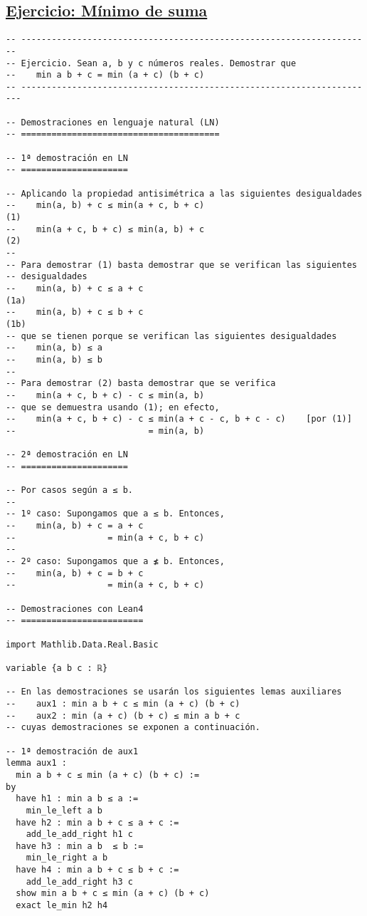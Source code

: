 \subsection{\href{./src/Basicos/Minimo\_de\_suma.lean}{Ejercicio: Mínimo de suma}}
\label{sec:org376a350}
\begin{verbatim}
-- ---------------------------------------------------------------------
-- Ejercicio. Sean a, b y c números reales. Demostrar que
--    min a b + c = min (a + c) (b + c)
-- ----------------------------------------------------------------------

-- Demostraciones en lenguaje natural (LN)
-- =======================================

-- 1ª demostración en LN
-- =====================

-- Aplicando la propiedad antisimétrica a las siguientes desigualdades
--    min(a, b) + c ≤ min(a + c, b + c)                               (1)
--    min(a + c, b + c) ≤ min(a, b) + c                               (2)
--
-- Para demostrar (1) basta demostrar que se verifican las siguientes
-- desigualdades
--    min(a, b) + c ≤ a + c                                          (1a)
--    min(a, b) + c ≤ b + c                                          (1b)
-- que se tienen porque se verifican las siguientes desigualdades
--    min(a, b) ≤ a
--    min(a, b) ≤ b
--
-- Para demostrar (2) basta demostrar que se verifica
--    min(a + c, b + c) - c ≤ min(a, b)
-- que se demuestra usando (1); en efecto,
--    min(a + c, b + c) - c ≤ min(a + c - c, b + c - c)    [por (1)]
--                          = min(a, b)

-- 2ª demostración en LN
-- =====================

-- Por casos según a ≤ b.
--
-- 1º caso: Supongamos que a ≤ b. Entonces,
--    min(a, b) + c = a + c
--                  = min(a + c, b + c)
--
-- 2º caso: Supongamos que a ≰ b. Entonces,
--    min(a, b) + c = b + c
--                  = min(a + c, b + c)

-- Demostraciones con Lean4
-- ========================

import Mathlib.Data.Real.Basic

variable {a b c : ℝ}

-- En las demostraciones se usarán los siguientes lemas auxiliares
--    aux1 : min a b + c ≤ min (a + c) (b + c)
--    aux2 : min (a + c) (b + c) ≤ min a b + c
-- cuyas demostraciones se exponen a continuación.

-- 1ª demostración de aux1
lemma aux1 :
  min a b + c ≤ min (a + c) (b + c) :=
by
  have h1 : min a b ≤ a :=
    min_le_left a b
  have h2 : min a b + c ≤ a + c :=
    add_le_add_right h1 c
  have h3 : min a b  ≤ b :=
    min_le_right a b
  have h4 : min a b + c ≤ b + c :=
    add_le_add_right h3 c
  show min a b + c ≤ min (a + c) (b + c)
  exact le_min h2 h4


\end{verbatim}
